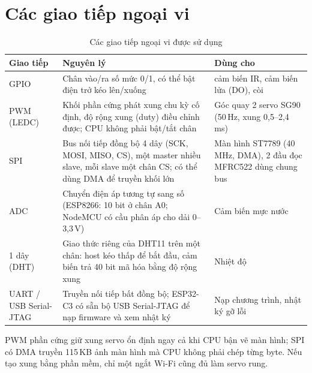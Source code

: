 \section{Các giao tiếp ngoại vi}
\begin{table}[H]
\centering\small
\caption{Các giao tiếp ngoại vi được sử dụng}\label{tab:interfaces}
\begin{tabularx}{\linewidth}{@{}p{2.6cm}X>{\raggedright\arraybackslash}p{4.1cm}@{}}
\toprule
\textbf{Giao tiếp} & \textbf{Nguyên lý} & \textbf{Dùng cho} \\ \midrule
GPIO & Chân vào/ra số mức 0/1, có thể bật điện trở kéo lên/xuống & 5 cảm biến IR, cảm biến lửa (DO), còi \\
PWM (LEDC) & Khối phần cứng phát xung chu kỳ cố định, độ rộng xung (duty) điều chỉnh được; CPU không phải bật/tắt chân & Góc quay 2 servo SG90 (50\,Hz, xung 0,5–2,4\,ms) \\
SPI & Bus nối tiếp đồng bộ 4 dây (SCK, MOSI, MISO, CS), một master nhiều slave, mỗi slave một chân CS; có thể dùng DMA để truyền khối lớn & Màn hình ST7789 (40\,MHz, DMA), 2 đầu đọc MFRC522 dùng chung bus \\
ADC & Chuyển điện áp tương tự sang số (ESP8266: 10 bit ở chân A0; NodeMCU có cầu phân áp cho dải 0–3,3\,V) & Cảm biến mực nước \\
1 dây (DHT) & Giao thức riêng của DHT11 trên một chân: host kéo thấp để bắt đầu, cảm biến trả 40 bit mã hóa bằng độ rộng xung & Nhiệt độ \\
UART / USB Serial-JTAG & Truyền nối tiếp bất đồng bộ; ESP32-C3 có sẵn bộ USB Serial-JTAG để nạp firmware và xem nhật ký & Nạp chương trình, nhật ký gỡ lỗi \\
\bottomrule
\end{tabularx}
\end{table}

\begin{lydo}
PWM phần cứng giữ xung servo ổn định ngay cả khi CPU bận vẽ màn hình; SPI có DMA truyền
115\,KB ảnh màn hình mà CPU không phải chép từng byte. Nếu tạo xung bằng phần mềm, chỉ một
ngắt Wi-Fi cũng đủ làm servo rung.
\end{lydo}

